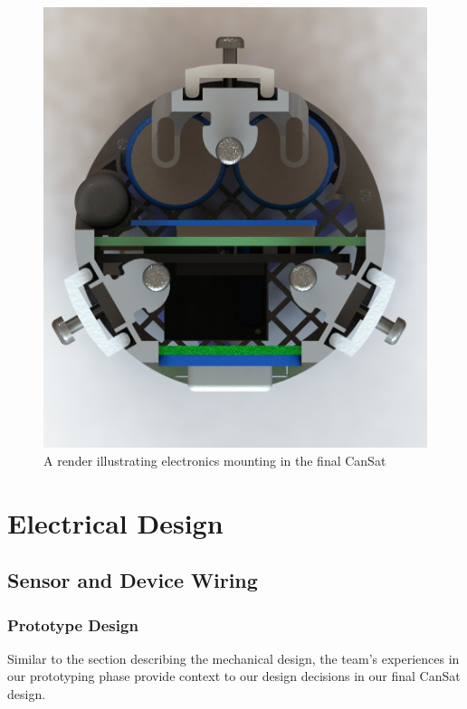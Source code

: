 \documentclass[]{report}
\begin{document}
\begin{figure}[h]
	\hfill\includegraphics[scale=0.5]{electronics_mount_render.jpg}\hspace*{\fill}
	\caption{A render illustrating electronics mounting in the final CanSat}
	\label{elecmount}
\end{figure}

\section{Electrical Design}
\subsection{Sensor and Device Wiring}
\subsubsection{Prototype Design}
Similar to the section describing the mechanical design, the team's experiences in our prototyping phase provide context to our design decisions in our final CanSat design.
\end{document}
